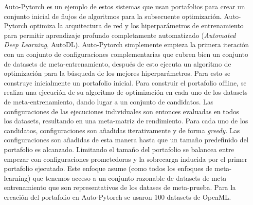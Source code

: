 Auto-Pytorch \cite{zimmer2021auto} es un ejemplo de estos sistemas que usan portafolios para crear un conjunto inicial de flujos de algoritmos para la subsecuente optimización. Auto-Pytorch optimiza la arquitectura de red y los hiperparámetros de entrenamiento para permitir aprendizaje profundo completamente automatizado (\textit{Automated Deep Learning}, AutoDL). 
 Auto-Pytorch simplemente empieza la primera iteración con un conjunto de configuraciones complementarias que cubren bien un conjunto de datasets de meta-entrenamiento, después de esto ejecuta un algoritmo de optimización para la búsqueda de los mejores hiperparámetros. Para esto se construye inicialmente un portafolio inicial. Para construir el portafolio offline, se realiza una ejecución de su algoritmo de optimización en cada uno de los datasets de meta-entrenamiento, dando lugar a un conjunto de candidatos. Las configuraciones de las ejecuciones individuales son entonces evaluadas en todos los datasets, resultando en una meta-matriz de rendimiento. Para cada uno de los candidatos, configuraciones son añadidas iterativamente y de forma \textit{greedy}.
 Las configuraciones son añadidas de esta manera hasta que un tamaño predefinido del portafolio es alcanzado. Limitando el tamaño del portafolio se balancea entre empezar con configuraciones prometedoras y la sobrecarga inducida por el primer portafolio ejecutado. Este enfoque asume (como todos los enfoques de meta-learning) que tenemos acceso a un conjunto razonable de datasets de meta-entrenamiento que son representativos de los datases de meta-prueba. Para la creación del portafolio en Auto-Pytorch se usaron 100 datasets de OpenML.

